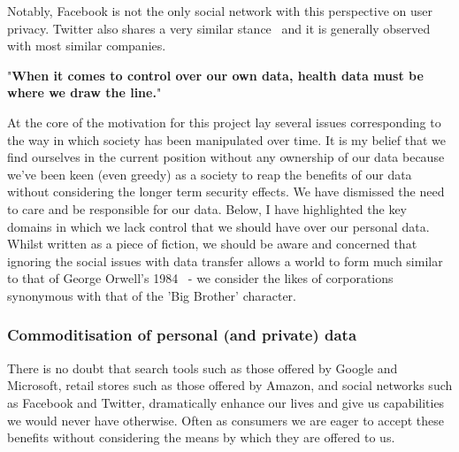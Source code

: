 Notably, Facebook is not the only social network with this perspective on user privacy. Twitter also shares a very similar stance~\autocite{twittertos:2017:online} and it is generally observed with most similar companies.

\begin{displayquote}{
  "\textbf{When it comes to control over our own data, health data must be where we draw the line.}"~\autocite{wilbankstopol:2016:article}
}\end{displayquote}






At the core of the motivation for this project lay several issues corresponding to the way in which society has been manipulated over time. It is my belief that we find ourselves in the current position without any ownership of our data because we've been keen (even greedy) as a society to reap the benefits of our data without considering the longer term security effects. We have dismissed the need to care and be responsible for our data. Below, I have highlighted the key domains in which we lack control that we should have over our personal data. Whilst written as a piece of fiction, we should be aware and concerned that ignoring the social issues with data transfer allows a world to form much similar to that of George Orwell's 1984~\autocite{orwell:1984:book} - we consider the likes of corporations synonymous with that of the 'Big Brother' character.

\subsubsection{Commoditisation of personal (and private) data}

There is no doubt that search tools such as those offered by Google and Microsoft, retail stores such as those offered by Amazon, and social networks such as Facebook and Twitter, dramatically enhance our lives and give us capabilities we would never have otherwise. Often as consumers we are eager to accept these benefits without considering the means by which they are offered to us.


